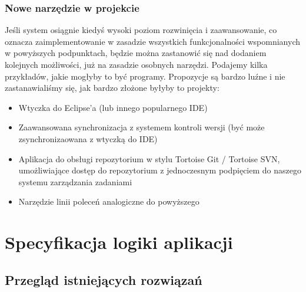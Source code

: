 \documentclass[a4paper,12pt,notitlepage]{mwrep}
\begin{document}
\subsection{Nowe narzędzie w projekcie}
Jeśli system osiągnie kiedyś wysoki poziom rozwinięcia i zaawansowanie, co oznacza zaimplementowanie
w zasadzie wszystkich funkcjonalności wspomnianych w powyższych podpunktach, będzie można zastanowić
się nad dodaniem kolejnych możliwości, już na zasadzie osobnych narzędzi. Podajemy kilka przykładów,
jakie mogłyby to być programy. Propozycje są bardzo luźne i nie zastanawialiśmy się, jak bardzo
złożone byłyby to projekty:
\begin{itemize}
	\item	Wtyczka do Eclipse’a (lub innego popularnego IDE)
	\item	Zaawansowana synchronizacja z systemem kontroli wersji (być może zsynchronizaowana z wtyczką do IDE)
	\item	Aplikacja do obsługi repozytorium w stylu Tortoise Git / Tortoise SVN, umożliwiające dostęp do
			repozytorium z jednoczesnym podpięciem do naszego systemu zarządzania zadaniami
	\item	Narzędzie linii poleceń analogiczne do powyższego
\end{itemize}






\chapter{Specyfikacja logiki aplikacji}
\section{Przegląd istniejących rozwiązań}
\end{document}
